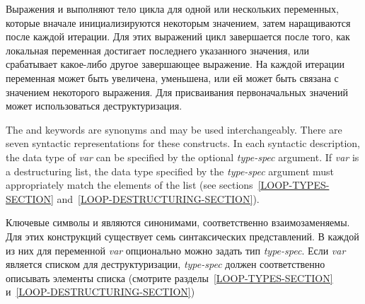 Выражения  и  выполняют тело цикла для одной или
нескольких переменных, которые вначале инициализируются некоторым
значением, затем наращиваются после каждой итерации.  Для этих
выражений цикл завершается после того, как локальная переменная
достигает последнего указанного значения, или срабатывает какое-либо
другое завершающее выражение. На каждой итерации переменная может быть
увеличена, уменьшена, или ей может быть связана с значением некоторого
выражения. Для присваивания первоначальных значений может
использоваться деструктуризация.

The  and  keywords are synonyms and may be used
interchangeably.  There are
seven syntactic representations for these constructs.
In each syntactic description, the data type of
\emph{var\/} can be specified by the optional \emph{type-spec\/}
argument.  If \emph{var\/} is a destructuring list, the data type
specified by the \emph{type-spec\/} argument must appropriately match
the elements of the list (see sections~\ref{LOOP-TYPES-SECTION}
and~\ref{LOOP-DESTRUCTURING-SECTION}).

Ключевые символы  и  являются синонимами,
соответственно взаимозаменяемы. Для этих конструкций существует семь
синтаксических представлений. В каждой из них для переменной
\emph{var} опционально можно задать тип \emph{type-spec}. Если
\emph{var} является списком для деструктуризации, \emph{type-spec}
должен соответственно описывать элементы списка (смотрите
разделы~\ref{LOOP-TYPES-SECTION} и~\ref{LOOP-DESTRUCTURING-SECTION})

